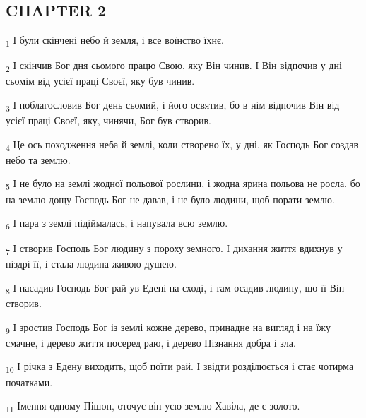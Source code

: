 \subsection{CHAPTER 2}
\begin{tcolorbox}
\textsubscript{1} І були скінчені небо й земля, і все воїнство їхнє.
\end{tcolorbox}
\begin{tcolorbox}
\textsubscript{2} І скінчив Бог дня сьомого працю Свою, яку Він чинив. І Він відпочив у дні сьомім від усієї праці Своєї, яку був чинив.
\end{tcolorbox}
\begin{tcolorbox}
\textsubscript{3} І поблагословив Бог день сьомий, і його освятив, бо в нім відпочив Він від усієї праці Своєї, яку, чинячи, Бог був створив.
\end{tcolorbox}
\begin{tcolorbox}
\textsubscript{4} Це ось походження неба й землі, коли створено їх, у дні, як Господь Бог создав небо та землю.
\end{tcolorbox}
\begin{tcolorbox}
\textsubscript{5} І не було на землі жодної польової рослини, і жодна ярина польова не росла, бо на землю дощу Господь Бог не давав, і не було людини, щоб порати землю.
\end{tcolorbox}
\begin{tcolorbox}
\textsubscript{6} І пара з землі підіймалась, і напувала всю землю.
\end{tcolorbox}
\begin{tcolorbox}
\textsubscript{7} І створив Господь Бог людину з пороху земного. І дихання життя вдихнув у ніздрі її, і стала людина живою душею.
\end{tcolorbox}
\begin{tcolorbox}
\textsubscript{8} І насадив Господь Бог рай ув Едені на сході, і там осадив людину, що її Він створив.
\end{tcolorbox}
\begin{tcolorbox}
\textsubscript{9} І зростив Господь Бог із землі кожне дерево, принадне на вигляд і на їжу смачне, і дерево життя посеред раю, і дерево Пізнання добра і зла.
\end{tcolorbox}
\begin{tcolorbox}
\textsubscript{10} І річка з Едену виходить, щоб поїти рай. І звідти розділюється і стає чотирма початками.
\end{tcolorbox}
\begin{tcolorbox}
\textsubscript{11} Імення одному Пішон, оточує він усю землю Хавіла, де є золото.
\end{tcolorbox}
